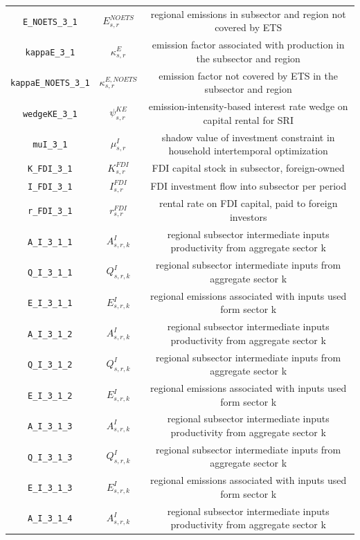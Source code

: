 \begin{center}
\begin{longtable}{ccc}
\texttt{E\_NOETS\_3\_1} & ${E^{NOETS}_{s,r}}$ & regional emissions in subsector and region not covered by ETS\\
\texttt{kappaE\_3\_1} & ${\kappa^{E}_{s,r}}$ & emission factor associated with production in the subsector and region\\
\texttt{kappaE\_NOETS\_3\_1} & ${\kappa^{E,NOETS}_{s,r}}$ & emission factor not covered by ETS in the subsector and region\\
\texttt{wedgeKE\_3\_1} & ${\psi^{KE}_{s,r}}$ & emission-intensity-based interest rate wedge on capital rental for SRI\\
\texttt{muI\_3\_1} & ${\mu^{I}_{s,r}}$ & shadow value of investment constraint in household intertemporal optimization\\
\texttt{K\_FDI\_3\_1} & ${K^{FDI}_{s,r}}$ & FDI capital stock in subsector, foreign-owned\\
\texttt{I\_FDI\_3\_1} & ${I^{FDI}_{s,r}}$ & FDI investment flow into subsector per period\\
\texttt{r\_FDI\_3\_1} & ${r^{FDI}_{s,r}}$ & rental rate on FDI capital, paid to foreign investors\\
\texttt{A\_I\_3\_1\_1} & ${A^{I}_{s,r,k}}$ & regional subsector intermediate inputs productivity from aggregate sector k\\
\texttt{Q\_I\_3\_1\_1} & ${Q^{I}_{s,r,k}}$ & regional subsector intermediate inputs from aggregate sector k\\
\texttt{E\_I\_3\_1\_1} & ${E^I_{s,r,k}}$ & regional emissions associated with inputs used form sector k\\
\texttt{A\_I\_3\_1\_2} & ${A^{I}_{s,r,k}}$ & regional subsector intermediate inputs productivity from aggregate sector k\\
\texttt{Q\_I\_3\_1\_2} & ${Q^{I}_{s,r,k}}$ & regional subsector intermediate inputs from aggregate sector k\\
\texttt{E\_I\_3\_1\_2} & ${E^I_{s,r,k}}$ & regional emissions associated with inputs used form sector k\\
\texttt{A\_I\_3\_1\_3} & ${A^{I}_{s,r,k}}$ & regional subsector intermediate inputs productivity from aggregate sector k\\
\texttt{Q\_I\_3\_1\_3} & ${Q^{I}_{s,r,k}}$ & regional subsector intermediate inputs from aggregate sector k\\
\texttt{E\_I\_3\_1\_3} & ${E^I_{s,r,k}}$ & regional emissions associated with inputs used form sector k\\
\texttt{A\_I\_3\_1\_4} & ${A^{I}_{s,r,k}}$ & regional subsector intermediate inputs productivity from aggregate sector k\\

\end{longtable}
\end{center}
